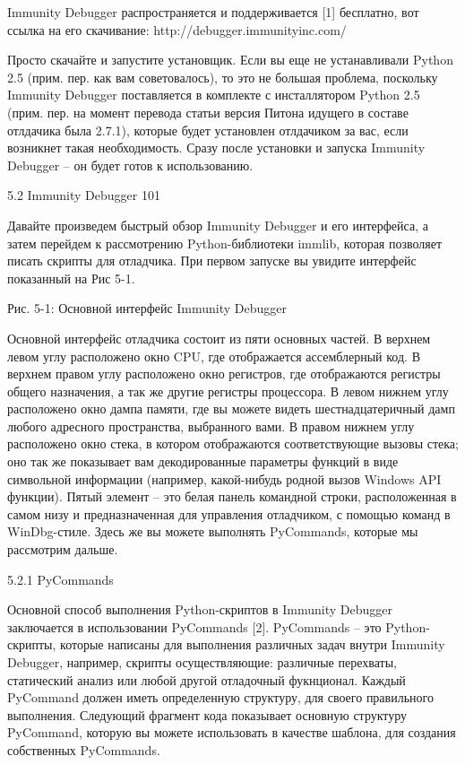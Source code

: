 \documentclass[12pt, a4paper, oneside]{book}
\begin{document}
Immunity Debugger распространяется и поддерживается [1] бесплатно, вот ссылка на его скачивание: http://debugger.immunityinc.com/

Просто скачайте и запустите установщик. Если вы еще не устанавливали Python 2.5 (прим. пер. как вам советовалось), то это не большая проблема, поскольку Immunity Debugger поставляется в комплекте с инсталлятором Python 2.5 (прим. пер. на момент перевода статьи версия Питона идущего в составе отлдачика была 2.7.1), которые будет установлен отлдачиком за вас, если возникнет такая необходимость. Сразу после установки и запуска Immunity Debugger – он будет готов к использованию.


5.2 Immunity Debugger 101

Давайте произведем быстрый обзор Immunity Debugger и его интерфейса, а затем перейдем к рассмотрению Python-библиотеки immlib, которая позволяет писать скрипты для отладчика. При первом запуске вы увидите интерфейс показанный на Рис 5-1.




Рис. 5-1: Основной интерфейс Immunity Debugger

Основной интерфейс отладчика состоит из пяти основных частей. В верхнем левом углу расположено окно CPU, где отображается ассемблерный код. В верхнем правом углу расположено окно регистров, где отображаются регистры общего назначения, а так же другие регистры процессора. В левом нижнем углу расположено окно дампа памяти, где вы можете видеть шестнадцатеричный дамп любого адресного пространства, выбранного вами. В правом нижнем углу расположено окно стека, в котором отображаются соответствующие вызовы стека; оно так же показывает вам декодированные параметры функций в виде символьной информации (например, какой-нибудь родной вызов Windows API функции). Пятый элемент – это белая панель командной строки, расположенная в самом низу и предназначенная для управления отладчиком, с помощью команд в WinDbg-стиле. Здесь же вы можете выполнять PyCommands, которые мы рассмотрим дальше.

5.2.1 PyCommands

Основной способ выполнения Python-скриптов в Immunity Debugger заключается в использовании PyCommands [2]. PyCommands – это Python-скрипты, которые написаны для выполнения различных задач внутри Immunity Debugger, например, скрипты осуществляющие: различные перехваты, статический анализ или любой другой отладочный фукнционал. Каждый PyCommand должен иметь определенную структуру, для своего правильного выполнения. Следующий фрагмент кода показывает основную структуру PyCommand, которую вы можете использовать в качестве шаблона, для создания собственных PyCommands.
\end{document}
